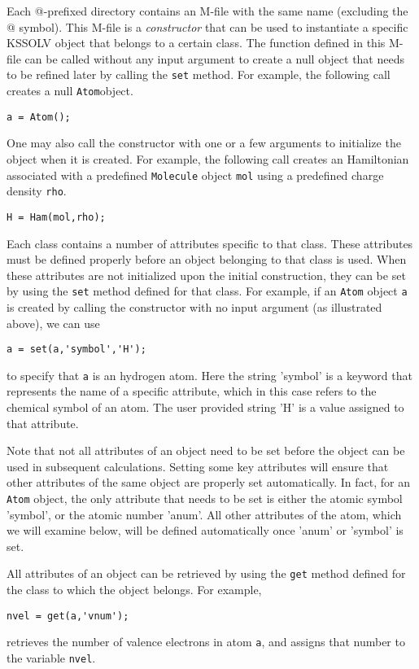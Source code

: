 \documentclass[11pt]{book}
\begin{document}
Each @-prefixed directory contains an M-file with the same name (excluding 
the @ symbol).  This M-file is a {\em constructor} that can be used to 
instantiate a specific KSSOLV object that belongs to a certain class.
The function defined in this M-file can be called without any input
argument to create a null object that needs to be refined later by calling 
the {\tt set} method.  For example, the following call creates a null {\tt Atom}object.
\begin{verbatim}
a = Atom();
\end{verbatim}
One may also call the constructor with one or a few arguments to initialize 
the object when it is created.  For example, the following call creates
an Hamiltonian associated with a predefined {\tt Molecule} object {\tt mol}
using a predefined charge density {\tt rho}.
\begin{verbatim}
H = Ham(mol,rho);
\end{verbatim}

Each class contains a number of attributes specific to that class. 
These attributes must be defined properly before an object belonging to that
class is used.  When these attributes are not initialized upon the initial
construction, they can be set by using the {\tt set} method defined
for that class.  For example, if an {\tt Atom} object {\tt a} is created
by calling the constructor with no input argument (as illustrated above),
we can use 
\begin{verbatim}
a = set(a,'symbol','H'); 
\end{verbatim}
to specify that {\tt a} is an hydrogen atom. Here the string 'symbol' 
is a keyword that represents the name of a specific attribute, which in
this case refers to the chemical symbol of an atom. The user
provided string 'H' is a value assigned to that attribute.  

Note that not all attributes of an object need to be set before the
object can be used in subsequent calculations. Setting some key attributes 
will ensure that other attributes of the same object are properly set 
automatically.  In fact, for an {\tt Atom} object, the only attribute
that needs to be set is either the atomic symbol 'symbol', or the atomic 
number 'anum'. All other attributes of the atom, which we will examine below, 
will be defined automatically once 'anum' or 'symbol' is set.

All attributes of an object can be retrieved by using the {\tt get} method
defined for the class to which the object belongs. For example,
\begin{verbatim}
nvel = get(a,'vnum');
\end{verbatim}
retrieves the number of valence electrons in atom {\tt a}, and assigns that
number to the variable {\tt nvel}.
\end{document}
